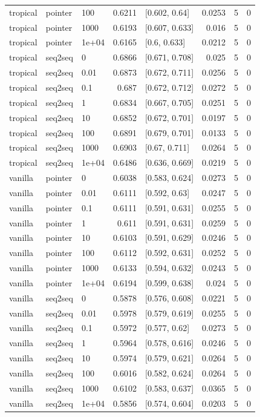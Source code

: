 \documentclass[10pt]{article}
\begin{document}
{\begin{longtable}{lllrlrrr}
tropical & pointer & 100 & 0.6211 & [0.602, 0.64] & 0.0253 & 5 & 0\\
tropical & pointer & 1000 & 0.6193 & [0.607, 0.633] & 0.016 & 5 & 0\\
tropical & pointer & 1e+04 & 0.6165 & [0.6, 0.633] & 0.0212 & 5 & 0\\
tropical & seq2seq & 0 & 0.6866 & [0.671, 0.708] & 0.025 & 5 & 0\\
tropical & seq2seq & 0.01 & 0.6873 & [0.672, 0.711] & 0.0256 & 5 & 0\\
tropical & seq2seq & 0.1 & 0.687 & [0.672, 0.712] & 0.0272 & 5 & 0\\
tropical & seq2seq & 1 & 0.6834 & [0.667, 0.705] & 0.0251 & 5 & 0\\
tropical & seq2seq & 10 & 0.6852 & [0.672, 0.701] & 0.0197 & 5 & 0\\
tropical & seq2seq & 100 & 0.6891 & [0.679, 0.701] & 0.0133 & 5 & 0\\
tropical & seq2seq & 1000 & 0.6903 & [0.67, 0.711] & 0.0264 & 5 & 0\\
tropical & seq2seq & 1e+04 & 0.6486 & [0.636, 0.669] & 0.0219 & 5 & 0\\
vanilla & pointer & 0 & 0.6038 & [0.583, 0.624] & 0.0273 & 5 & 0\\
vanilla & pointer & 0.01 & 0.6111 & [0.592, 0.63] & 0.0247 & 5 & 0\\
vanilla & pointer & 0.1 & 0.6111 & [0.591, 0.631] & 0.0255 & 5 & 0\\
vanilla & pointer & 1 & 0.611 & [0.591, 0.631] & 0.0259 & 5 & 0\\
vanilla & pointer & 10 & 0.6103 & [0.591, 0.629] & 0.0246 & 5 & 0\\
vanilla & pointer & 100 & 0.6112 & [0.592, 0.631] & 0.0252 & 5 & 0\\
vanilla & pointer & 1000 & 0.6133 & [0.594, 0.632] & 0.0243 & 5 & 0\\
vanilla & pointer & 1e+04 & 0.6194 & [0.599, 0.638] & 0.024 & 5 & 0\\
vanilla & seq2seq & 0 & 0.5878 & [0.576, 0.608] & 0.0221 & 5 & 0\\
vanilla & seq2seq & 0.01 & 0.5978 & [0.579, 0.619] & 0.0255 & 5 & 0\\
vanilla & seq2seq & 0.1 & 0.5972 & [0.577, 0.62] & 0.0273 & 5 & 0\\
vanilla & seq2seq & 1 & 0.5964 & [0.578, 0.616] & 0.0246 & 5 & 0\\
vanilla & seq2seq & 10 & 0.5974 & [0.579, 0.621] & 0.0264 & 5 & 0\\
vanilla & seq2seq & 100 & 0.6016 & [0.582, 0.624] & 0.0264 & 5 & 0\\
vanilla & seq2seq & 1000 & 0.6102 & [0.583, 0.637] & 0.0365 & 5 & 0\\
vanilla & seq2seq & 1e+04 & 0.5856 & [0.574, 0.604] & 0.0203 & 5 & 0\\
\bottomrule
\end{longtable}
}
\end{document}
